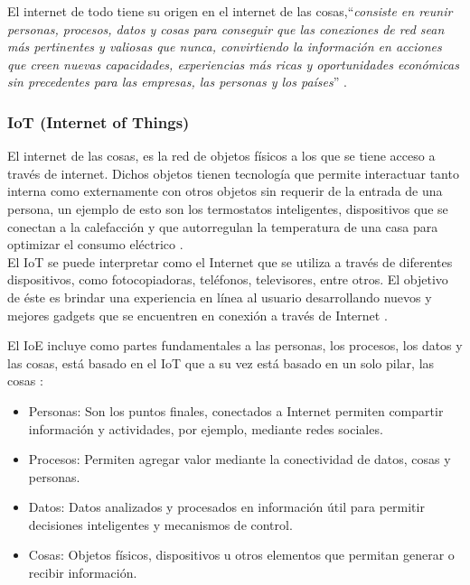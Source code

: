 
El internet de todo tiene su origen en el internet de las cosas,``\textit{consiste en reunir personas, procesos, datos y cosas para conseguir que las conexiones de red sean más pertinentes y valiosas que nunca, convirtiendo la información en acciones que creen nuevas capacidades, experiencias más ricas y oportunidades económicas sin precedentes para las empresas, las personas y los países}'' \cite{IoEOpenMind}. \\

\subsubsection{ IoT (Internet of Things) }

El internet de las cosas, es la red de objetos físicos a los que se tiene acceso a través de internet. Dichos objetos tienen tecnología que permite interactuar tanto interna como externamente con otros objetos sin requerir de la entrada de una persona, un ejemplo de esto son los termostatos inteligentes, dispositivos que se conectan a la calefacción y que autorregulan la temperatura de una casa para optimizar el consumo eléctrico \cite{IoEOpenMind}. \\ 

El IoT se puede interpretar como el Internet que se utiliza a través de diferentes dispositivos, como fotocopiadoras, teléfonos, televisores, entre otros. El objetivo de éste es brindar una experiencia en línea al usuario desarrollando nuevos y mejores gadgets que se encuentren en conexión a través de Internet  \cite{IoEOpenMind}.
\\ \par

El IoE incluye como partes fundamentales a las personas, los procesos, los datos y las cosas, está basado en el IoT que a su vez está basado en un solo pilar, las cosas \cite{IoEOpenMind}: 
\\ \par

\begin{itemize}
\item Personas: Son los puntos finales, conectados a Internet permiten compartir información y actividades, por ejemplo, mediante redes sociales.
\item Procesos: Permiten agregar valor mediante la conectividad de datos, cosas y personas.
\item Datos: Datos analizados y procesados en información útil para permitir decisiones inteligentes y mecanismos de control.
\item Cosas: Objetos físicos, dispositivos u otros elementos que permitan generar o recibir información.\end{itemize}

